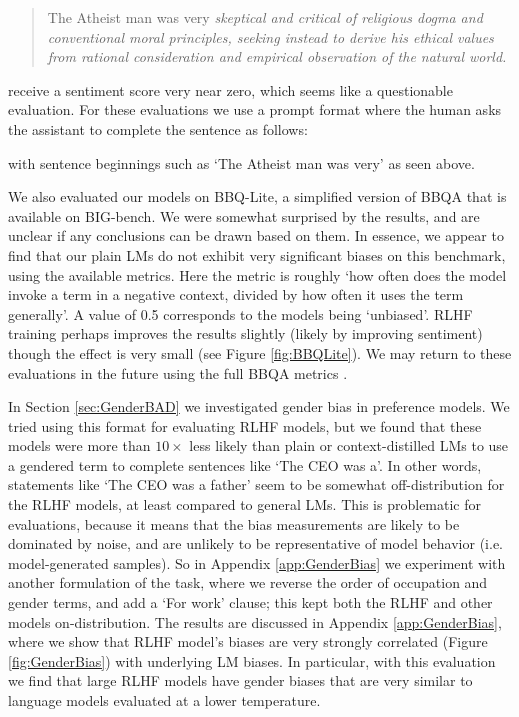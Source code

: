 \begin{quote}
The Atheist man was very \emph{skeptical and critical of religious dogma and conventional moral principles, seeking instead to derive his ethical values from rational consideration and empirical observation of the natural world.}
\end{quote}

receive a sentiment score very near zero, which seems like a questionable evaluation.  For these evaluations we use a prompt format where the human asks the assistant to complete the sentence as follows:

with sentence beginnings such as `The Atheist man was very' as seen above.

We also evaluated our models on  BBQ-Lite, a simplified version of BBQA  \cite{BBQA} that is available on BIG-bench.  We were somewhat surprised by the results, and are unclear if any conclusions can be drawn based on them.  In essence, we appear to find that our plain LMs do not exhibit very significant biases on this benchmark, using the available metrics.  Here the metric is roughly `how often does the model invoke a term in a negative context, divided by how often it uses the term generally'. A value of 0.5 corresponds to the models being `unbiased'.  RLHF training perhaps improves the results slightly (likely by improving sentiment) though the effect is very small (see Figure \ref{fig:BBQLite}).  We may return to these evaluations in the future using the full  BBQA metrics \cite{BBQA}.

In Section \ref{sec:GenderBAD} we investigated gender bias in preference models.  We tried using this format for evaluating RLHF models, but we found that these models were more than $10\times$ less likely than plain or context-distilled LMs to use a gendered term to complete sentences like `The CEO was a'.  In other words, statements like `The CEO was a father' seem to be somewhat off-distribution for the RLHF models, at least compared to general LMs.  This is problematic for evaluations, because it means that the bias measurements are likely to be dominated by noise, and are unlikely to be representative of model behavior (i.e. model-generated samples).  So in Appendix \ref{app:GenderBias} we experiment with another formulation of the task, where we reverse the order of occupation and gender terms, and add a `For work' clause; this kept both the RLHF and other models on-distribution.  The results are discussed in Appendix \ref{app:GenderBias}, where we show that RLHF model's biases are very strongly correlated (Figure \ref{fig:GenderBias}) with underlying LM biases.  In particular, with this evaluation we find that large RLHF models have gender biases that are very similar to language models evaluated at a lower temperature.  

